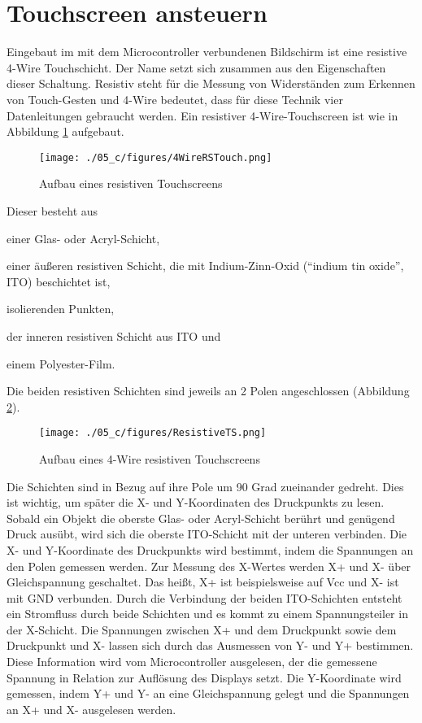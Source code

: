 \section{\ExercisePrefixEmbeddedC Touchscreen ansteuern \optional}
Eingebaut im mit dem Microcontroller verbundenen Bildschirm ist eine resistive 4-Wire Touchschicht.
Der Name setzt sich zusammen aus den Eigenschaften dieser Schaltung.
Resistiv steht für die Messung von Widerständen zum Erkennen von Touch-Gesten und 4-Wire bedeutet, dass für diese Technik vier Datenleitungen gebraucht werden.
Ein resistiver 4-Wire-Touchscreen ist wie in Abbildung \ref{fig:rsTouch} aufgebaut.

\begin{figure}[!htb]
    \centering
    \texttt{[image: ./05\_c/figures/4WireRSTouch.png]}
    \caption{Aufbau eines resistiven Touchscreens}
    \label{fig:rsTouch}
\end{figure}

Dieser besteht aus
\begin{inparaenum}
\item
einer Glas- oder Acryl-Schicht,
\item 
einer äußeren resistiven Schicht, die mit Indium-Zinn-Oxid (\enquote{indium tin oxide}, ITO) beschichtet ist,
\item 
isolierenden Punkten,
\item 
der inneren resistiven Schicht aus ITO und 
\item
einem Polyester-Film.
\end{inparaenum}
Die beiden resistiven Schichten sind jeweils an 2 Polen angeschlossen (Abbildung \ref{fig:fourRSTouch}).

\begin{figure}[!htb]
    \centering
    \texttt{[image: ./05\_c/figures/ResistiveTS.png]}
    \caption{Aufbau eines 4-Wire resistiven Touchscreens }
    \label{fig:fourRSTouch}
\end{figure} 

Die Schichten sind in Bezug auf ihre Pole um 90 Grad zueinander gedreht.
Dies ist wichtig, um später die X- und Y-Koordinaten des Druckpunkts zu lesen.
Sobald ein Objekt die oberste Glas- oder Acryl-Schicht berührt und genügend Druck ausübt, wird sich die oberste ITO-Schicht mit der unteren verbinden.
Die X- und Y-Koordinate des Druckpunkts wird bestimmt, indem die Spannungen an den Polen gemessen werden.
Zur Messung des X-Wertes werden X+ und X- über Gleichspannung geschaltet.
Das heißt, X+ ist beispielsweise auf Vcc und X- ist mit GND verbunden.
Durch die Verbindung der beiden ITO-Schichten entsteht ein Stromfluss durch beide Schichten und es kommt zu einem Spannungsteiler in der X-Schicht.
Die Spannungen zwischen X+ und dem Druckpunkt sowie dem Druckpunkt und X- lassen sich durch das Ausmessen von Y- und Y+ bestimmen.
Diese Information wird vom Microcontroller ausgelesen, der die gemessene Spannung in Relation zur Auflösung des Displays setzt.
Die Y-Koordinate wird gemessen, indem Y+ und Y- an eine Gleichspannung gelegt und die Spannungen an X+ und X- ausgelesen werden.

